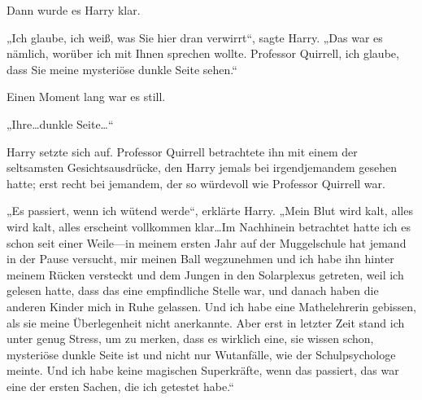 Dann wurde es Harry klar.

„Ich glaube, ich weiß, was Sie hier dran verwirrt“, sagte Harry. „Das war es nämlich, worüber ich mit Ihnen sprechen wollte. Professor Quirrell, ich glaube, dass Sie meine mysteriöse dunkle Seite sehen.“

Einen Moment lang war es still.

„Ihre…dunkle Seite…“

Harry setzte sich auf. Professor Quirrell betrachtete ihn mit einem der seltsamsten Gesichtsausdrücke, den Harry jemals bei irgendjemandem gesehen hatte; erst recht bei jemandem, der so würdevoll wie Professor Quirrell war.

„Es passiert, wenn ich wütend werde“, erklärte Harry. „Mein Blut wird kalt, alles wird kalt, alles erscheint vollkommen klar…Im Nachhinein betrachtet hatte ich es schon seit einer Weile—in meinem ersten Jahr auf der Muggelschule hat jemand in der Pause versucht, mir meinen Ball wegzunehmen und ich habe ihn hinter meinem Rücken versteckt und dem Jungen in den Solarplexus getreten, weil ich gelesen hatte, dass das eine empfindliche Stelle war, und danach haben die anderen Kinder mich in Ruhe gelassen. Und ich habe eine Mathelehrerin gebissen, als sie meine Überlegenheit nicht anerkannte. Aber erst in letzter Zeit stand ich unter genug Stress, um zu merken, dass es wirklich eine, sie wissen schon, mysteriöse dunkle Seite ist und nicht nur Wutanfälle, wie der Schulpsychologe meinte. Und ich habe keine magischen Superkräfte, wenn das passiert, das war eine der ersten Sachen, die ich getestet habe.“

